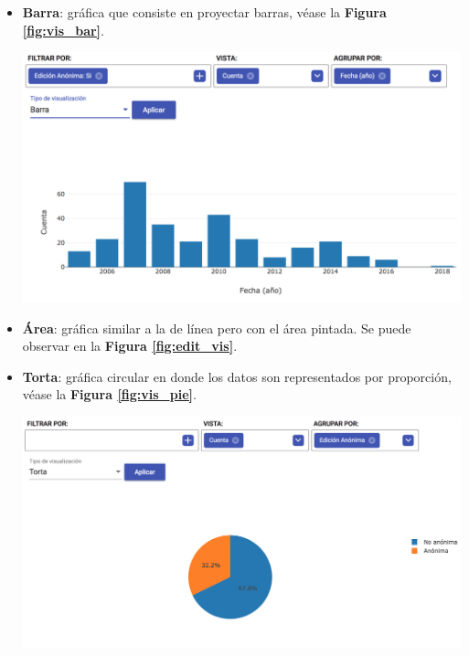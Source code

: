 \begin{enumerate}
\begin{itemize}
    \item\textbf{Barra}: gráfica que consiste en proyectar barras, véase la \textbf{Figura \ref{fig:vis_bar}}.
        \begin{center}
          \bigbreak
          \includegraphics[scale=0.35]{images/marco_aplicativo/vis_bar.png}
          \label{fig:vis_bar}
          \bigbreak
        \end{center}

    \item\textbf{Área}: gráfica similar a la de línea pero con el área pintada. Se puede observar en la \textbf{Figura \ref{fig:edit_vis}}.
    
    \item\textbf{Torta}: gráfica circular en donde los datos son representados por proporción, véase la \textbf{Figura \ref{fig:vis_pie}}.
        \begin{center}
          \bigbreak
          \includegraphics[scale=0.3]{images/marco_aplicativo/vis_pie.png}
          \label{fig:vis_pie}
          \bigbreak
        \end{center}
        

\end{itemize}
\end{enumerate}
